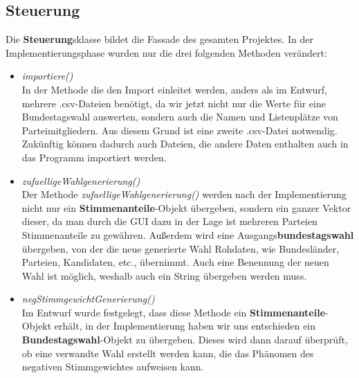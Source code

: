 \documentclass[12pt,a4paper,titlepage]{article}
\newcommand{\myma}{\fontfamily{pcr}\selectfont \textbf}
\newcommand{\mymo}{\fontfamily{pcr}\selectfont \textit}
\begin{document}
\subsection{Steuerung}
Die {\myma{Steuerung}}sklasse bildet die Fassade des gesamten Projektes. In der Implementierungsphase wurden nur die drei folgenden Methoden verändert:
\begin{itemize}
\item {\mymo{importiere()}}\\
In der Methode die den Import einleitet werden, anders als im Entwurf, mehrere .csv-Dateien benötigt, da wir jetzt nicht nur die Werte für eine Bundestagswahl auswerten, sondern auch die Namen und Listenplätze von Parteimitgliedern. 
Aus diesem Grund ist eine zweite .csv-Datei notwendig.\\
Zukünftig können dadurch auch Dateien, die andere Daten enthalten auch in das Programm importiert werden.\\
 
\item {\mymo{zufaelligeWahlgenerierung()}}\\
Der Methode {\mymo{zufaelligeWahlgenerierung()}} werden nach der Implementierung nicht nur ein {\myma{Stimmenanteile}}-Objekt übergeben, sondern ein ganzer Vektor dieser, da man durch die GUI dazu in der Lage ist
mehreren Parteien Stimmenanteile zu gewähren. Außerdem wird eine Ausgangs{\myma{bundestagswahl}} übergeben, von der die neue generierte Wahl Rohdaten, wie Bundesländer, Parteien, Kandidaten, etc., übernimmt. Auch eine Benennung der neuen Wahl ist möglich, weshalb auch ein String übergeben werden muss.\\

\item {\mymo{negStimmgewichtGenerierung()}}\\
Im Entwurf wurde festgelegt, dass diese Methode ein {\myma{Stimmenanteile}}-Objekt erhält, in der Implementierung haben wir uns entschieden ein {\myma{Bundestagswahl}}-Objekt zu übergeben. Dieses wird dann darauf überprüft, ob eine verwandte Wahl erstellt werden kann, die das Phänomen des negativen Stimmgewichtes aufweisen kann. \\

\end{itemize}
	
\end{document}
